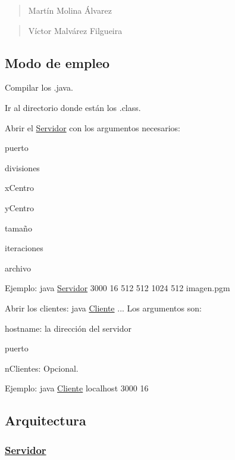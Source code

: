 \begin{quote}
Martín Molina Álvarez \end{quote}


\begin{quote}
Víctor Malvárez Filgueira \end{quote}


\subsection*{Modo de empleo}


\begin{DoxyEnumerate}
\item Compilar los {\ttfamily .java}.
\item Ir al directorio donde están los {\ttfamily .class}.
\item Abrir el \hyperlink{classServidor}{Servidor} con los argumentos necesarios\+:
\begin{DoxyItemize}
\item puerto
\item divisiones
\item x\+Centro
\item y\+Centro
\item tamaño
\item iteraciones
\item archivo
\end{DoxyItemize}
\item Ejemplo\+: {\ttfamily java \hyperlink{classServidor}{Servidor} 3000 16 512 512 1024 512 imagen.\+pgm}
\item Abrir los clientes\+: {\ttfamily java \hyperlink{classCliente}{Cliente} ...} Los argumentos son\+:
\begin{DoxyItemize}
\item hostname\+: la dirección del servidor
\item puerto
\item n\+Clientes\+: Opcional.
\end{DoxyItemize}
\item Ejemplo\+: {\ttfamily java \hyperlink{classCliente}{Cliente} localhost 3000 16}
\end{DoxyEnumerate}

\subsection*{Arquitectura}

\subsubsection*{\hyperlink{classServidor}{Servidor}}

